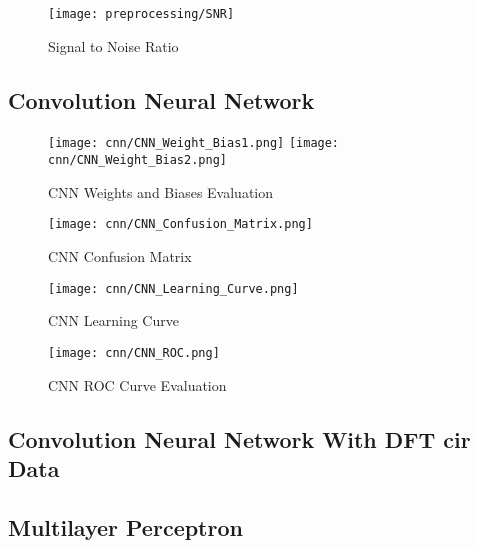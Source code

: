 \begin{figure}[H] %
	\centering %
	\texttt{[image: preprocessing/SNR]} %
	\caption{Signal to Noise Ratio}\label{fig:snr}
\end{figure}


\subsection{Convolution Neural Network}\label{cnn_visual}

\begin{figure}[H] 
  \centering
  \texttt{[image: cnn/CNN\_Weight\_Bias1.png]}
  \texttt{[image: cnn/CNN\_Weight\_Bias2.png]}
  \caption{CNN Weights and Biases Evaluation}\label{fig:cnn_weight_bias}
\end{figure}

\begin{figure}[H] 
  \centering
  \texttt{[image: cnn/CNN\_Confusion\_Matrix.png]}
  \caption{CNN Confusion Matrix}\label{fig:cnn_confusion_matrix}
\end{figure}

\begin{figure}[H] 
  \centering
  \texttt{[image: cnn/CNN\_Learning\_Curve.png]}
  \caption{CNN Learning Curve}\label{fig:cnn_learning_curve}
\end{figure}

\begin{figure}[H] 
  \centering
  \texttt{[image: cnn/CNN\_ROC.png]}
  \caption{CNN ROC Curve Evaluation}\label{fig:cnn_roc_curve}
\end{figure}

\subsection{Convolution Neural Network With DFT \gls{cir} Data}\label{cnn_visual_dft}


\subsection{Multilayer Perceptron}\label{mlp_visual}

